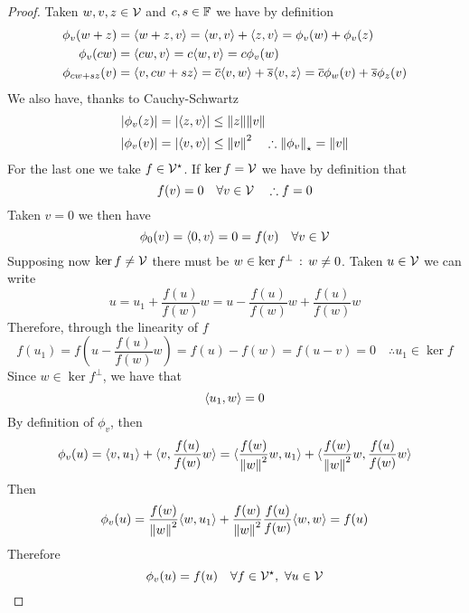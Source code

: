 \documentclass[../complete.tex]{subfiles}
\begin{document}
\begin{proof}
	Taken $w,v,z\in\mathcal{V}$ and $c,s\in\mathbb{F}$ we have by definition
	\begin{equation*}
		\begin{aligned}
			\phi_v(w+z)&=\langle w+z, v \rangle=\langle w, v \rangle+\langle z, v \rangle=\phi_v(w)+\phi_v(z)\\
			\phi_v(cw)&=\langle cw, v \rangle=c\langle w, v \rangle=c\phi_v(w)\\
			\phi_{cw+sz}(v)&=\langle v, cw+sz \rangle=\overline{c}\langle v, w \rangle+\overline{s}\langle v, z \rangle=\overline{c}\phi_w(v)+\overline{s}\phi_z(v)
		\end{aligned}
	\end{equation*}
	We also have, thanks to Cauchy-Schwartz
	\begin{equation*}
		\begin{aligned}
			\abs{\phi_v(z)}&=\abs{\langle z, v \rangle}\le\norm{z}\norm{v}\\
			\abs{\phi_v(v)}&=\abs{\langle v, v \rangle}\le\norm{v}^2\quad\therefore\norm{\phi_v}_{\star}=\norm{v}
		\end{aligned}
	\end{equation*}
	For the last one we take $f\in\mathcal{V}^\star$. If $\ker f=\mathcal{V}$ we have by definition that
	\begin{equation*}
		f(v)=0\quad\forall v\in\mathcal{V}\quad\therefore f=0
	\end{equation*}
	Taken $v=0$ we then have
	\begin{equation*}
		\phi_0(v)=\langle 0, v \rangle=0=f(v)\quad\forall v\in\mathcal{V}
	\end{equation*}
	Supposing now $\ker f\ne\mathcal{V}$ there must be $w\in\ker f^\perp\, :\,  w\ne0$. Taken $u\in\mathcal{V}$ we can write
	\begin{equation*}
		u=u_1+\frac{f(u)}{f(w)}w=u-\frac{f(u)}{f(w)}w+\frac{f(u)}{f(w)}w
	\end{equation*}
	Therefore, through the linearity of $f$
	\begin{equation*}
		f(u_1)=f\left( u-\frac{f(u)}{f(w)}w \right)=f(u)-f(w)=f(u-v)=0\quad\therefore u_1\in\ker f
	\end{equation*}
	Since $w\in\ker f^\perp$, we have that
	\begin{equation*}
		\langle u_1, w \rangle=0
	\end{equation*}
	By definition of $\phi_v$, then
	\begin{equation*}
		\phi_v(u)=\langle v, u_1 \rangle+\langle v, \frac{f(u)}{f(w)}w \rangle=\langle \frac{f(w)}{\norm{w}^2}w, u_1 \rangle+\langle \frac{f(w)}{\norm{w}^2}w, \frac{f(u)}{f(w)}w \rangle
	\end{equation*}
	Then
	\begin{equation*}
		\phi_v(u)=\frac{f(w)}{\norm{w}^2}\langle w, u_1 \rangle+\frac{f(w)}{\norm{w}^2}\frac{f(u)}{f(w)}\langle w, w \rangle=f(u)
	\end{equation*}
	Therefore
	\begin{equation*}
		\phi_v(u)=f(u)\quad\forall f\in\mathcal{V}^\star,\ \forall u\in\mathcal{V}
	\end{equation*}
\end{proof}
\end{document}
